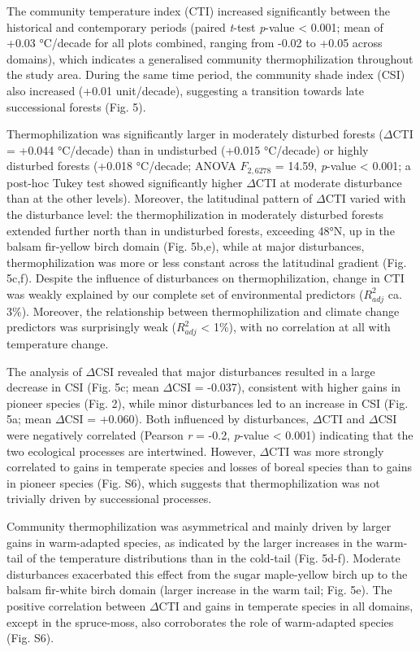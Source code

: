 \documentclass[
  a4paperpaper,
]{article}
\begin{document}
The community temperature index (CTI) increased significantly between
the historical and contemporary periods (paired \emph{t}-test
\emph{p}-value \textless{} 0.001; mean of +0.03 °C/decade for all plots
combined, ranging from -0.02 to +0.05 across domains), which indicates a
generalised community thermophilization throughout the study area.
During the same time period, the community shade index (CSI) also
increased (+0.01 unit/decade), suggesting a transition towards late
successional forests (Fig. 5).

Thermophilization was significantly larger in moderately disturbed
forests (\(\Delta\)CTI = +0.044 °C/decade) than in undisturbed (+0.015
°C/decade) or highly disturbed forests (+0.018 °C/decade; ANOVA
\(F_{2, 6278}\) = 14.59, \emph{p}-value \textless{} 0.001; a post-hoc
Tukey test showed significantly higher \(\Delta\)CTI at moderate
disturbance than at the other levels). Moreover, the latitudinal pattern
of \(\Delta\)CTI varied with the disturbance level: the
thermophilization in moderately disturbed forests extended further north
than in undisturbed forests, exceeding 48°N, up in the balsam fir-yellow
birch domain (Fig. 5b,e), while at major disturbances, thermophilization
was more or less constant across the latitudinal gradient (Fig. 5c,f).
Despite the influence of disturbances on thermophilization, change in
CTI was weakly explained by our complete set of environmental predictors
(\(R^2_{adj}\) ca. 3\%). Moreover, the relationship between
thermophilization and climate change predictors was surprisingly weak
(\(R^2_{adj}\) \textless{} 1\%), with no correlation at all with
temperature change.

The analysis of \(\Delta\)CSI revealed that major disturbances resulted
in a large decrease in CSI (Fig. 5c; mean \(\Delta\)CSI = -0.037),
consistent with higher gains in pioneer species (Fig. 2), while minor
disturbances led to an increase in CSI (Fig. 5a; mean \(\Delta\)CSI =
+0.060). Both influenced by disturbances, \(\Delta\)CTI and
\(\Delta\)CSI were negatively correlated (Pearson \emph{r} = -0.2,
\emph{p}-value \textless{} 0.001) indicating that the two ecological
processes are intertwined. However, \(\Delta\)CTI was more strongly
correlated to gains in temperate species and losses of boreal species
than to gains in pioneer species (Fig. S6), which suggests that
thermophilization was not trivially driven by successional processes.

Community thermophilization was asymmetrical and mainly driven by larger
gains in warm-adapted species, as indicated by the larger increases in
the warm-tail of the temperature distributions than in the cold-tail
(Fig. 5d-f). Moderate disturbances exacerbated this effect from the
sugar maple-yellow birch up to the balsam fir-white birch domain (larger
increase in the warm tail; Fig. 5e). The positive correlation between
\(\Delta\)CTI and gains in temperate species in all domains, except in
the spruce-moss, also corroborates the role of warm-adapted species
(Fig. S6).
\end{document}
